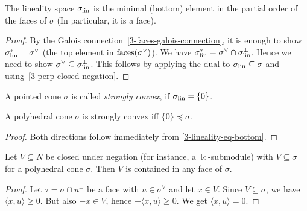 \begin{lemma}
  \label{3-lineality-eq-bottom}
  The lineality space \( \sigma_{\operatorname{lin}} \) is the minimal (bottom)
  element in the partial order of the faces of \( \sigma \) (In
  particular, it is a face).
\end{lemma}
\begin{proof}
  By the Galois connection~\ref{3-faces-galois-connection}, it is
  enough to show \( \sigma_{\operatorname{lin}}^* = \sigma^{\vee} \) (the top
  element in \( \operatorname{faces}(\sigma^{\vee}) \)). We have \( \sigma_{\operatorname{lin}}^* =
  \sigma^{\vee} \cap \sigma_{\operatorname{lin}}^{\perp} \). Hence we need to show
  \( \sigma^{\vee} \subseteq \sigma_{\operatorname{lin}}^{\perp} \). This follows by
  applying the dual to \( \sigma_{\operatorname{lin}} \subseteq \sigma \) and
  using~\ref{3-perp-closed-negation}.
\end{proof}

\begin{definition}
  \label{3-strongly-convex}
  A pointed cone \( \sigma \) is called \emph{strongly convex}, if \(
  \sigma_{\operatorname{lin}} = \{0\} \).
\end{definition}

\begin{lemma}
  \label{3-strongly-convex-iff-zero-face}
  A polyhedral cone \( \sigma \) is strongly convex iff \( \{0\}
  \preceq \sigma \).
\end{lemma}
\begin{proof}
  \uses{}
  Both directions follow immediately from \ref{3-lineality-eq-bottom}.
\end{proof}

\begin{lemma}
  \label{3-subvectorspace-contained-in-faces}
  Let \( V \subseteq N \) be closed under negation (for instance, a \(
  \Bbbk \)-submodule) with \( V \subseteq \sigma \) for a polyhedral
  cone \( \sigma \). Then \( V \) is contained in any face of \(
  \sigma \).
\end{lemma}
\begin{proof}
  \uses{}
  Let \( \tau = \sigma \cap u^{\perp} \) be a face with \( u \in
  \sigma^{\vee} \) and let \( x \in V \). Since \( V \subseteq \sigma
  \), we have \( \langle x, u \rangle \geq 0 \). But also \( -x \in V
  \), hence \( -\langle x, u \rangle \geq 0 \). We get \( \langle x,
  u \rangle = 0 \).
\end{proof}

